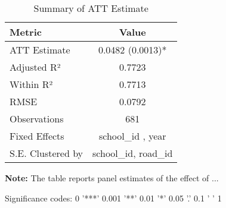 \begin{table}[H]
\centering
\caption{Summary of ATT Estimate}
\label{tab:SA_hca_100p}
 \begin{center}
 \begin{tabular}{lc}
 \toprule
Metric & Value \\
\midrule
ATT Estimate & 0.0482 (0.0013)* \\
\hline 
 Adjusted R² & 0.7723 \\
Within R² & 0.7713 \\
RMSE & 0.0792 \\
Observations & 681 \\
\hline 
 Fixed Effects & school_id ,  year \\
S.E. Clustered by & school_id, road_id \\
\bottomrule
\end{tabular}
 \end{center}\begin{tablenotes}
\small
\item \textbf{Note:} The table reports panel estimates of the effect of ...
\item Significance codes: 0 '***' 0.001 '**' 0.01 '*' 0.05 '.' 0.1 ' ' 1
\end{tablenotes}
\end{table}